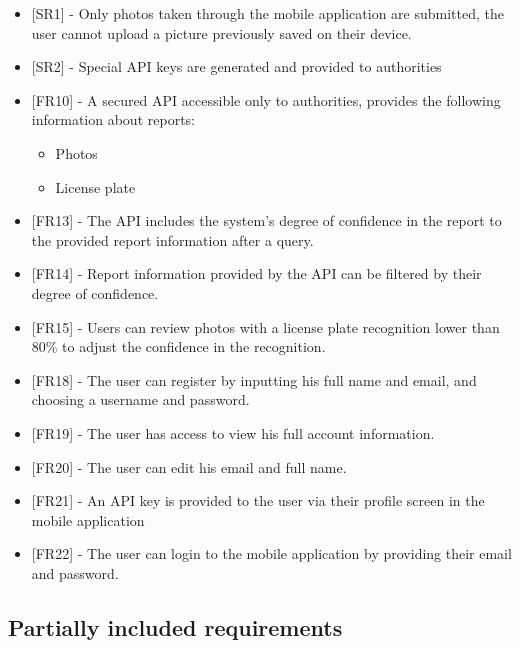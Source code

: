 \begin{itemize}[label={}]
            \item {[SR1]} - Only photos taken through the mobile application are submitted, the user cannot upload a picture previously saved on their device.

            \item {[SR2]} - Special API keys are generated and provided to authorities
            \item {[FR10]} - A secured API accessible only to authorities, provides the following information about reports:
            \begin{itemize}[label={\textbullet}]
                \item Photos
                \item License plate
            \end{itemize}
            
            \item {[FR13]} - The API includes the system’s degree of confidence in the report to the provided report information after a query.
            \item {[FR14]} - Report information provided by the API can be filtered by their degree of confidence.
            \item {[FR15]} - Users can review photos with a license plate recognition lower than 80\% to adjust the confidence in the recognition.

            \item {[FR18]} - The user can register by inputting his full name and email, and choosing a username and password.
            \item {[FR19]} - The user has access to view his full account information.
            \item {[FR20]} - The user can edit his email and full name.
            \item {[FR21]} - An API key is provided to the user via their profile screen in the mobile application
            \item {[FR22]} - The user can login to the mobile application by providing their email and password.
\end{itemize}


\subsection{Partially included requirements}

